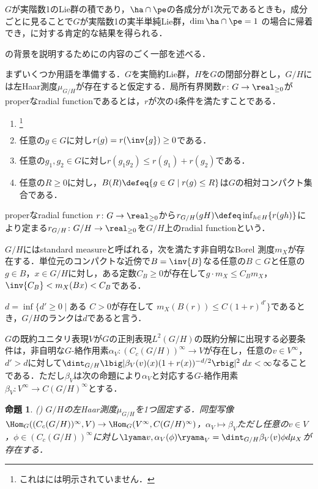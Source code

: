 \documentclass[12pt,dvipdfmx,uplatex]{jsarticle}
\newcounter{countabst}
\newtheorem{prop-a}[countabst]{命題}
\begin{document}
$G$が実階数1のLie群の積であり，$\ha\cap \pe $の各成分が1次元であるときも，成分ごとに見ることで$G$が実階数1の実半単純Lie群，$\dim \ha\cap\pe =1 $
の場合に帰着でき，に対する肯定的な結果を得られる．

の背景を説明するために\cite{ber88}の内容のごく一部を述べる．

まずいくつか用語を準備する．$G$を実簡約Lie群，$H$を$G$の閉部分群とし，$G/H$には左Haar測度$\mu_{G/H} $が存在すると仮定する．局所有界関数$r\colon G\to \real_{\geq 0} $がproperなradial functionであるとは，$r$が次の4条件を満たすことである．
\vspace{-1em}
\begin{enumerate}
\item {}\footnote{これは\cite{ber88}には明示されていません．}
\item 任意の$g\in G$に対し$r(g) = r(\inv{g})\geq 0  $である．
\item 任意の$g_1,g_2\in G$に対し$r(g_1g_2)\leq r(g_1) + r(g_2)  $である．
\item 任意の$R\geq 0$に対し，$B(R)\defeq \{g\in G\mid r(g)\leq R \} $は$G$の相対コンパクト集合である．
\end{enumerate}
\vspace{-0.5em}
properなradial function $r\colon G\to \real_{\geq 0} $から$r_{G/H}(gH)\defeq \inf_{h\in H}\{r(gh) \}$により定まる${r_{G/H}\colon G/H\to \real_{\geq 0}}$を$G/H$上のradial functionという．

$G/H$にはstandard measureと呼ばれる，次を満たす非自明なBorel 測度$m_X $が存在する．単位元のコンパクトな近傍で$B = \inv{B} $なる任意の$B\subset G$と任意の$g\in B$，$x\in G/H$に対し，ある定数$C_B\geq 0 $が存在して$g\cdot m_X \leq C_B m_X$，$ \inv{C_B} < m_X(Bx) < C_{B}$である．

$d = \inf\{d'\geq 0\mid \text{ある } C > 0\text{が存在して }  m_X(B(r))\leq C(1+r)^{d'}\} $であるとき，$G/H$のランクは$d$であると言う．

$G$の既約ユニタリ表現$V$が$G$の正則表現$L^2(G/H)$の既約分解に出現する必要条件は，非自明な$G$-絡作用素$\alpha_V\colon (C_c(G/H))^{\infty}\to V $が存在し，任意の$v\in V^{\infty} $，$d' > d$に対して$\dint_{G/H}\lbig|\beta_V(v)(x)(1+r(x))^{-d/2} \rbig|^2\; dx < \infty $なることである．ただし$\beta_V $は次の命題により$\alpha_V $と対応する$G$-絡作用素$\beta_V\colon V^{\infty}\to C(G/H)^{\infty}  $とする．
\begin{prop-a}(\cite[p.~678]{ber88})
  $G/H$の左Haar測度$\mu_{G/H} $を1つ固定する．同型写像$\Hom_{G}((C_c(G/H))^{\infty}, V )\to \Hom_{G}(V^{\infty}, C(G/H)^{\infty}) $，$\alpha_V\mapsto \beta_V$ただし任意の$v\in V$，$\phi \in  (C_c(G/H))^{\infty} $に対し$ \lyama v,\alpha_V(\phi)\ryama_{V} = \dint_{G/H}\beta_V(v)\phi d\mu_X  $が存在する．
\end{prop-a}
\end{document}
